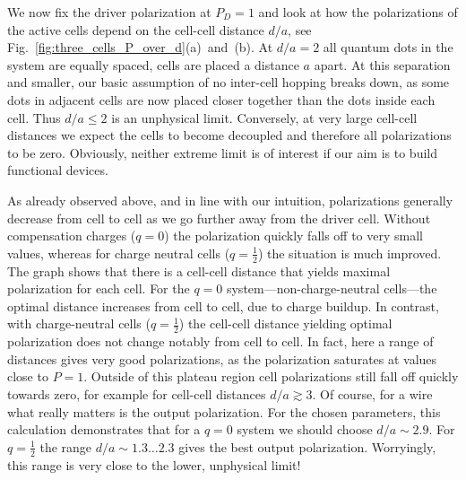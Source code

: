 We now fix the driver polarization at $P_D = 1$ and look at how the
polarizations of the active cells depend on the cell-cell distance $d/a$, see
Fig.~\ref{fig:three_cells_P_over_d}(a)~and~(b). At $d/a = 2$ all quantum dots in
the system are equally spaced, cells are placed a distance $a$ apart. At this
separation and smaller, our basic assumption of no inter-cell hopping breaks
down, as some dots in adjacent cells are now placed closer together than the
dots inside each cell. Thus $d/a \le 2$ is an unphysical limit. Conversely, at
very large cell-cell distances we expect the cells to become decoupled and
therefore all polarizations to be zero. Obviously, neither extreme limit is of
interest if our aim is to build functional  devices.

As already observed above, and in line with our intuition, polarizations
generally decrease from cell to cell as we go further away from the driver cell.
Without compensation charges ($q=0$) the polarization quickly falls off to very
small values, whereas for charge neutral cells ($q = \frac{1}{2}$) the situation
is much improved. The graph shows that there is a cell-cell distance that yields
maximal polarization for each cell. For the $q=0$ system---non-charge-neutral
cells---the optimal distance increases from cell to cell, due to charge buildup.
In contrast, with charge-neutral cells ($q=\frac{1}{2}$) the cell-cell distance
yielding optimal polarization does not change notably from cell to cell. In
fact, here a range of distances gives very good polarizations, as the
polarization saturates at values close to $P = 1$. Outside of this plateau
region cell polarizations still fall off quickly towards zero, for example for
cell-cell distances $d/a \gtrsim 3$. Of course, for a wire what really matters
is the output polarization. For the chosen parameters, this calculation
demonstrates that for a $q=0$ system we should choose $d/a \sim 2.9$. For
$q=\frac{1}{2}$ the range $d/a \sim 1.3 \ldots 2.3$ gives the best output
polarization. Worryingly, this range is very close to the lower, unphysical
limit!

